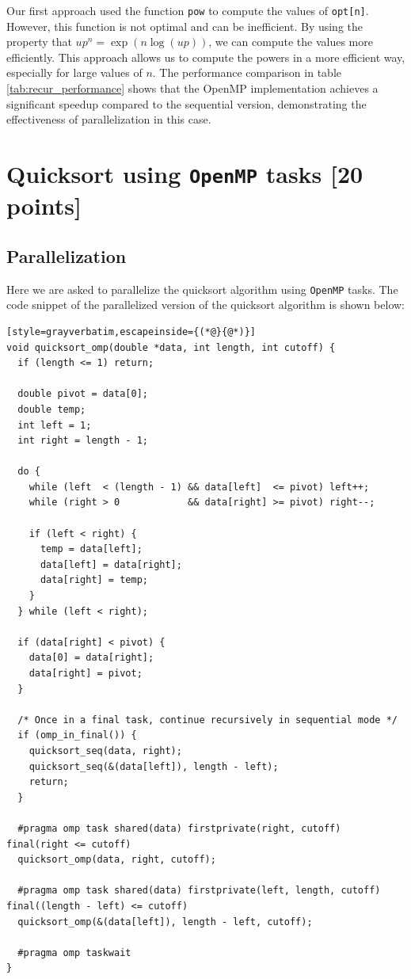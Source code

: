 \documentclass[unicode,10pt,a4paper,oneside,numbers=endperiod,openany]{scrartcl}
\begin{document}
Our first approach used the function \texttt{pow} to compute the values of \texttt{opt[n]}. However, this function is not optimal and can be inefficient. By using the property that $up^n = \exp(n \log(up))$, we can compute the values more efficiently. This approach allows us to compute the powers in a more efficient way, especially for large values of $n$. The performance comparison in table \ref{tab:recur_performance} shows that the OpenMP implementation achieves a significant speedup compared to the sequential version, demonstrating the effectiveness of parallelization in this case.

\newpage
\section{Quicksort using \texttt{OpenMP} tasks [20 points]}
\subsection{Parallelization}
Here we are asked to parallelize the quicksort algorithm using \texttt{OpenMP} tasks. The code snippet of the parallelized version of the quicksort algorithm is shown below:
\begin{lstlisting}[style=grayverbatim,escapeinside={(*@}{@*)}]
void quicksort_omp(double *data, int length, int cutoff) {
  if (length <= 1) return;

  double pivot = data[0];
  double temp;
  int left = 1;
  int right = length - 1;

  do {
    while (left  < (length - 1) && data[left]  <= pivot) left++;
    while (right > 0            && data[right] >= pivot) right--;

    if (left < right) {
      temp = data[left];
      data[left] = data[right];
      data[right] = temp;
    }
  } while (left < right);

  if (data[right] < pivot) {
    data[0] = data[right];
    data[right] = pivot;
  }

  /* Once in a final task, continue recursively in sequential mode */
  if (omp_in_final()) {
    quicksort_seq(data, right);
    quicksort_seq(&(data[left]), length - left);
    return;
  }

  #pragma omp task shared(data) firstprivate(right, cutoff) final(right <= cutoff)
  quicksort_omp(data, right, cutoff);

  #pragma omp task shared(data) firstprivate(left, length, cutoff) final((length - left) <= cutoff)
  quicksort_omp(&(data[left]), length - left, cutoff);

  #pragma omp taskwait
}
\end{lstlisting}
\end{document}
